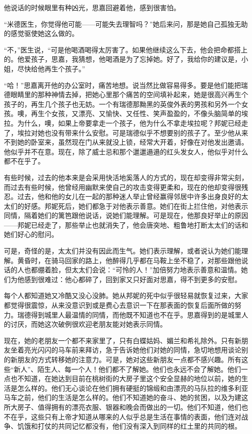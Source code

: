 \par 他说话的时候眼里有种凶光，思嘉回避着他，感到很害怕。
\par “米德医生，你觉得他可能——可能失去理智吗？”她后来问，那是她自己孤独无助的感觉驱使她这么做的。
\par “不，”医生说，“可是他喝酒喝得太厉害了。如果他继续这么下去，他会把命都搭上的。他爱孩子，思嘉，我猜想，他喝酒是为了忘掉她。好了，我给你的建议是，小姐，尽快给他再生个孩子。”
\par “哈！”思嘉离开他的办公室时，痛苦地想。说当然比做容易得多。要是他们能把瑞德眼睛里的那种神情去掉，把她心里那个痛苦的空间填补起来，她是很高兴再生个孩子的，再生几个孩子也无妨。一个有瑞德那黝黑的英俊外表的男孩和另外一个女孩。噢，再生个女孩，又漂亮、又愉快、又任性、笑声盈盈的，不像头脑简单的埃拉。为什么，噢，如果上帝要拿走一个孩子，他为什么不拿走埃拉呢？邦妮已经走了，埃拉对她也没有带来什么安慰。可是瑞德似乎不想要别的孩子了。至少他从来不到她的卧室来，虽然现在门从来就没上锁，经常大开着，好像在对他发出邀请。他似乎并不在意。现在，除了威士忌和那个邋邋遢遢的红头发女人，他似乎对什么都不在乎了。
\par 有些时候，过去的他本来是会采用快活地奚落人的方式的，现在却变得非常尖刻，而过去有些时候，他曾经用幽默来使自己的攻击变得更柔和，现在的他却变得很残忍。过去，他和他的女儿在一起的那种迷人举止曾经赢得邻居中许多出身良好的太太们的好感。邦妮死后，她们都急于对他表示善意。她们在街上拦住他，对他表示同情，隔着她们的篱笆跟他说话，说她们能理解。可是现在，他那良好举止的原因——邦妮已经走了，那些举止也就消失了，他会唐突地、粗鲁地打断太太们的话和她们好心的慰问。
\par 可是，奇怪的是，太太们并没有因此而生气。她们表示理解，或者说认为她们能理解。黄昏时，在骑马回家的路上，他醉得几乎都在马鞍上坐不稳了，对那些跟他说话的人也都绷着脸，但太太们会说：“可怜的人！”加倍努力地表示善意和温情。她们为他感到很难过：他心都碎了，回到家又只好面对思嘉，得不到更多的安慰。
\par 每个人都知道她又冷酷又没心没肺。她从邦妮的死中似乎很轻易就恢复过来，大家都觉得很震惊，从来没意识到或是费心去意识一下在那表面的恢复后面所做的努力。瑞德得到城里人最温情的同情，而他既不知道也不在乎。思嘉得到的是城里人的讨厌，而她这次破例很欢迎老朋友能对她表示同情。
\par 现在，她的老朋友一个都不来家里了，只有白蝶姑妈、媚兰和希礼除外。只有新朋友坐着亮光闪闪的马车前来拜访，急于告诉她他们对她的同情，急切地想用谈论别的新朋友的方式转移她的注意力。可是，她对这些新朋友一点都不感兴趣。所有这些“新人”、陌生人、每一个人！他们都不了解她。他们也永远不会了解她。他们一点也不知道，在她达到目前在桃树街的大房子里这个安全显赫的地位以前，她的生活是怎么样的。他们无心谈论在他们拥有硬挺的锦缎和由漂亮的马队拉的维多利亚马车之前，他们的生活是怎么样的。他们不知道她的奋斗、她的贫困，以及为建这所大房子、值得拥有的漂亮衣服、银器和晚会而做出的一切。他们不知道，他们也不在乎，这些只有上帝才知道从哪来的人似乎总是生活在事情的表面，他们连对战争、饥饿和打仗的共同记忆都没有，他们没有深入到同样的红土里的共同的根。
